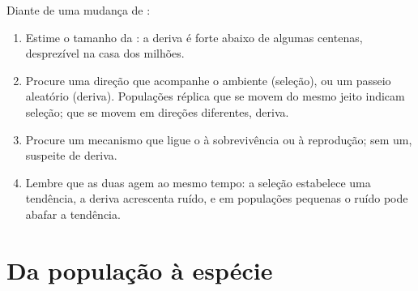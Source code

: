 \begin{method}\label{met:g12:selection-drift-speciation:which}
Diante de uma mudança de :
\begin{enumerate}
  \item Estime o tamanho da : a deriva é forte abaixo de
        algumas centenas, desprezível na casa dos milhões.
  \item Procure uma direção que acompanhe o ambiente (seleção), ou um
        passeio aleatório (deriva). Populações réplica que se movem do
        mesmo jeito indicam seleção; que se movem em direções
        diferentes, deriva.
  \item Procure um mecanismo que ligue o  à sobrevivência ou à
        reprodução; sem um, suspeite de deriva.
  \item Lembre que as duas agem ao mesmo tempo: a seleção estabelece
        uma tendência, a deriva acrescenta ruído, e em populações
        pequenas o ruído pode abafar a tendência.
\end{enumerate}
\end{method}

\section{Da população à espécie}

